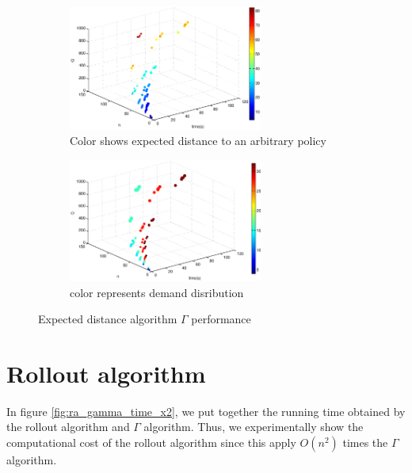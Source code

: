 \begin{figure}[!htbp]
  \begin{center}
  \begin{subfigure}[h]{1\textwidth}
   \includegraphics[width=0.7\textwidth]{Images/Chapter5/expected_distance3D.eps}
   \caption{Color shows expected distance to an arbitrary policy }\label{fig:expected_distance3D_time}
  \end{subfigure}
  \begin{subfigure}[h]{1\textwidth}
   \includegraphics[width=0.7\textwidth]{Images/Chapter5/expected_distance3D_range.eps}
   \caption{color represents demand disribution}\label{fig:expected_distance3D_range_time}
  \end{subfigure}
   
  \end{center}
    \caption{Expected distance algorithm  $\Gamma$ performance}\label{fig:expected_distance3D}
\end{figure}

\clearpage

\section{Rollout algorithm}

In figure \ref{fig:ra_gamma_time_x2}, we put together the running time obtained by the rollout algorithm and $\Gamma$ algorithm. Thus, we experimentally show  the computational cost of the rollout algorithm since this apply $O(n^2)$ times the $\Gamma$ algorithm.

